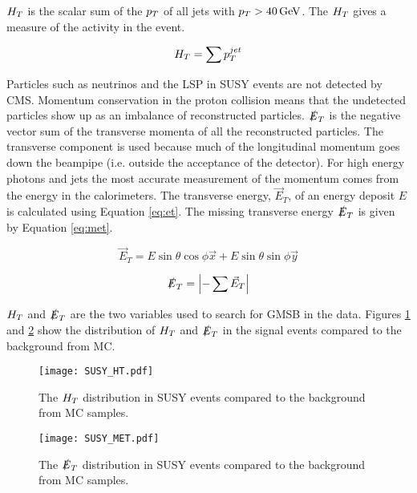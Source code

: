 $H_{T}$ is the scalar sum of the $p_{T}$ of all jets with $p_{T} > 40\, \mathrm{GeV}$. The
$H_{T}$ gives a measure of the activity in the event.

\begin{equation}
H_{T} = \sum p_{T}^{jet}
\end{equation}

Particles such as neutrinos and the LSP in SUSY events are not detected by CMS.
Momentum conservation in the proton collision means that the undetected 
particles show up as an imbalance of reconstructed particles. $\slashed{E}_{T}$ is the
negative vector sum of the transverse momenta of all the reconstructed
particles. The transverse component is used because much of the longitudinal
momentum goes down the beampipe (i.e. outside the acceptance of the detector). 
For high energy photons and jets the most accurate measurement of the
momentum comes from the energy in the calorimeters. The transverse energy,
$\vec{E}_{T}$, of an energy deposit $E$ is calculated using Equation 
\ref{eq:et}. The missing transverse energy $\slashed{E}_{T}$ is given by Equation
\ref{eq:met}.

\begin{equation}
\vec{E}_{T} = E\sin{\theta}\cos{\phi}\vec{x} + E\sin{\theta}\sin{\phi}\vec{y}
\label{eq:et}
\end{equation}

\begin{equation}
\slashed{E}_{T} = \left| - \sum \vec{E}_{T} \right|
\label{eq:met}
\end{equation}

$H_{T}$ and $\slashed{E}_{T}$ are the two variables used to search for GMSB in the data.
Figures \ref{fig:susy_ht} and \ref{fig:susy_met} show the distribution of $H_{T}$ 
and $\slashed{E}_{T}$ in the signal events compared to the background from MC.

\begin{figure}
\begin{center}
\texttt{[image: SUSY\_HT.pdf]}
\end{center}
\caption{The $H_{T}$ distribution in SUSY events compared to the background from
MC samples.}
\label{fig:susy_ht}
\end{figure} 

\begin{figure}
\begin{center}
\texttt{[image: SUSY\_MET.pdf]}
\end{center}
\caption{The $\slashed{E}_{T}$ distribution in SUSY events compared to the background from
MC samples.}
\label{fig:susy_met}
\end{figure} 

